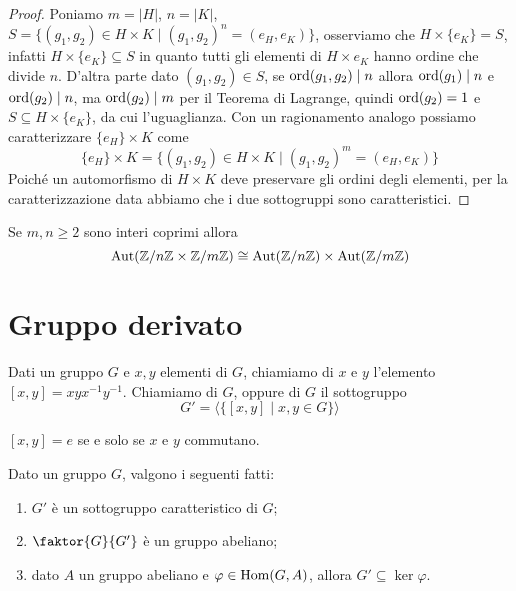 \documentclass[11pt]{scrartcl}
\begin{document}
\begin{proof}
    Poniamo $m = |H|$, $n = |K|$, $S = \{(g_1, g_2) \in H\times K\mid 
    (g_1, g_2)^n = (e_H, e_K)\}$, osserviamo che $H\times \{e_K\} = S$, infatti 
    $H\times \{e_K\} \subseteq S$ in quanto tutti gli elementi di $H\times{e_K}$
    hanno ordine che divide $n$. D'altra parte dato $(g_1, g_2) \in S$, se
    $\operatorname{ord}(g_1, g_2) \mid n$ allora $\operatorname{ord}(g_1)\mid n$ e $\operatorname{ord}(g_2)\mid n$, ma 
    $\operatorname{ord}(g_2) \mid m$ per il Teorema di Lagrange, quindi $\operatorname{ord}(g_2) = 1$ e
    $S \subseteq H\times\{e_K\}$, da cui l'uguaglianza. Con un ragionamento
    analogo possiamo caratterizzare $\{e_H\} \times K$ come 
    \[
        \{e_H\} \times K = \{(g_1, g_2) \in H\times K\mid (g_1, g_2)^m = (e_H, e_K)\}
    \] Poiché un automorfismo di $H\times K$ deve preservare gli ordini degli
    elementi, per la caratterizzazione data abbiamo che i due sottogruppi sono
    caratteristici.
\end{proof}

\begin{corollary}
    Se $m, n \geqslant 2$ sono interi coprimi allora
    \[
        \operatorname{Aut}({\mathbb Z}/n{\mathbb Z}\times{\mathbb Z}/m{\mathbb Z}) \cong \operatorname{Aut}({\mathbb Z}/n{\mathbb Z})\times \operatorname{Aut}({\mathbb Z}/m{\mathbb Z})
    \]
\end{corollary}

\newpage

\section{Gruppo derivato}

\begin{definition}
    Dati un gruppo $G$ e $x, y$ elementi di $G$, chiamiamo 
    di $x$ e $y$ l'elemento $[x, y] = xyx^{-1}y^{-1}$. Chiamiamo  di $G$, oppure  di $G$
     il sottogruppo 
    \[
        G' = \langle\{[x, y]\mid x, y \in G\}\rangle
    \]
\end{definition}

\begin{remark}
    $[x, y] = e$ se e solo se $x$ e $y$ commutano.
\end{remark}

\begin{proposition}
    Dato un gruppo $G$, valgono i seguenti fatti:
    \begin{enumerate}[(1)]
        \item $G'$ è un sottogruppo caratteristico di $G$;
        \item $\faktor{G}{G'}$ è un gruppo abeliano;
        \item dato $A$ un gruppo abeliano e $\varphi \in \operatorname{Hom}(G, A)$,
        allora $G' \subseteq \ker\varphi$.
    \end{enumerate}
\end{proposition}
\end{document}
